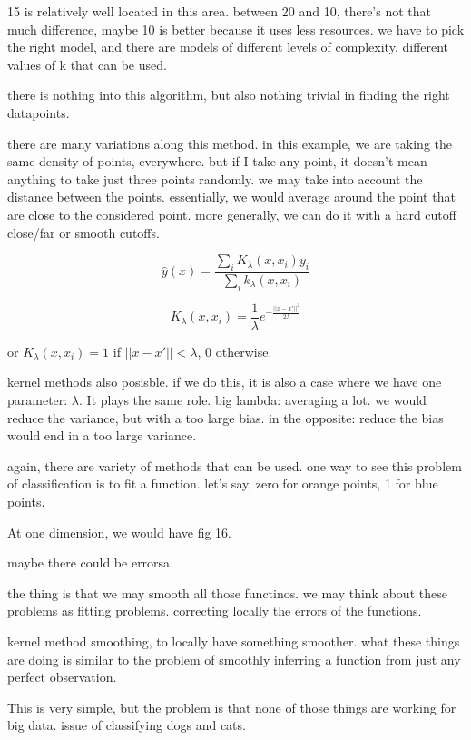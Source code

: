 \documentclass[a4paper]{tufte-book}
\begin{document}
15 is relatively well located in this area.
between 20 and 10, there's not that much difference, maybe 10 is better
because it uses less resources.
we have to pick the right model, and there are models of different levels of
complexity.
different values of k that can be used.

there is nothing into this algorithm, but also nothing trivial in finding the right datapoints.

there are many variations along this method.
in this example, we are taking the same density of points, everywhere. but if I take any point, it doesn't mean anything to take just three points
randomly.
we may take into account the distance between the points.
essentially, we would average around the point that are close to the considered
point. more generally, we can do it with a hard cutoff close/far or smooth
cutoffs.

\begin{equation}
    \hat y(x) = \frac{\sum_i K_\lambda (x,x_i)y_i}{\sum_i k_\lambda (x,x_i)}
\end{equation}

\begin{equation}
    K_\lambda (x,x_i) = \frac{1}{\lambda} e^{-\frac{||x-x'||^2}{2\lambda}}
\end{equation}

or $K_\lambda (x,x_i) = 1$ if $||x-x'||<\lambda$, 0 otherwise.

kernel methods also posisble.
if we do this, it is also a case where we have one parameter: $\lambda$. It plays
the same role.
big lambda: averaging a lot.
we would reduce the variance, but with a too large bias.
in the opposite: reduce the bias would end in a too large variance.

again, there are variety of methods that can be used. one way to see this
problem of classification is to fit a function.
let's say, zero for orange points, 1 for blue points.

At one dimension, we would have
fig 16.

maybe there could be errorsa

the thing is that we may smooth all those functinos.
we may think about these problems as fitting problems. correcting locally
the errors of the functions.

kernel method smoothing, to locally have something smoother.
what these things are doing is similar to the problem of smoothly inferring a
function from just any perfect observation.

This is very simple, but the problem is that none of those things are working
for big data. issue of classifying dogs and cats.
\end{document}
